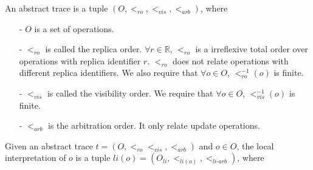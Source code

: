 
An abstract trace is a tuple $(O,<_{\textit{ro}},<_{\textit{vis}},<_{\textit{arb}})$, where

\begin{itemize}
\setlength{\itemsep}{0.5pt}
\item[-] $O$ is a set of operations.

\item[-] $<_{\textit{ro}}$ is called the replica order. $\forall r \in \mathbb{R}$, $<_{\textit{ro}}$ is a irreflexive total order over operations with replica identifier $r$. $<_{\textit{ro}}$ does not relate operations with different replica identifiers. We also require that $\forall o \in O$, $<_{\textit{ro}}^{-1}(o)$ is finite.

\item[-] $<_{\textit{vis}}$ is called the visibility order. We require that $\forall o \in O$, $<_{\textit{vis}}^{-1}(o)$ is finite.

\item[-] $<_{\textit{arb}}$ is the arbitration order. {\color {red}It only relate update operations.}
\end{itemize}


Given an abstract trace $t = (O,<_{\textit{ro}}<_{\textit{vis}},<_{\textit{arb}})$ and $o \in O$, {\color {red}the local interpretation of $o$ is a tuple $li(o) = ( O_{li} ,<_{li(o)}, <_{\textit{li-arb}} )$}, where

